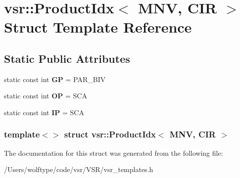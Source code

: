 \hypertarget{structvsr_1_1_product_idx_3_01_m_n_v_00_01_c_i_r_01_4}{\section{vsr\-:\-:Product\-Idx$<$ M\-N\-V, C\-I\-R $>$ Struct Template Reference}
\label{structvsr_1_1_product_idx_3_01_m_n_v_00_01_c_i_r_01_4}
}
\subsection*{Static Public Attributes}
\begin{DoxyCompactItemize}
\item 
\hypertarget{structvsr_1_1_product_idx_3_01_m_n_v_00_01_c_i_r_01_4_a42b840fcd64c8e949ede3c8b4a2ac0c9}{static const int {\bfseries G\-P} = P\-A\-R\-\_\-\-B\-I\-V}\label{structvsr_1_1_product_idx_3_01_m_n_v_00_01_c_i_r_01_4_a42b840fcd64c8e949ede3c8b4a2ac0c9}

\item 
\hypertarget{structvsr_1_1_product_idx_3_01_m_n_v_00_01_c_i_r_01_4_aef86ecf32cfba9eada7f1b51248a1289}{static const int {\bfseries O\-P} = S\-C\-A}\label{structvsr_1_1_product_idx_3_01_m_n_v_00_01_c_i_r_01_4_aef86ecf32cfba9eada7f1b51248a1289}

\item 
\hypertarget{structvsr_1_1_product_idx_3_01_m_n_v_00_01_c_i_r_01_4_a95b32bd49ed1a33cfb746a2975b254dc}{static const int {\bfseries I\-P} = S\-C\-A}\label{structvsr_1_1_product_idx_3_01_m_n_v_00_01_c_i_r_01_4_a95b32bd49ed1a33cfb746a2975b254dc}

\end{DoxyCompactItemize}
\subsubsection*{template$<$$>$ struct vsr\-::\-Product\-Idx$<$ M\-N\-V, C\-I\-R $>$}



The documentation for this struct was generated from the following file\-:\begin{DoxyCompactItemize}
\item 
/\-Users/wolftype/code/vsr/\-V\-S\-R/vsr\-\_\-templates.\-h\end{DoxyCompactItemize}
